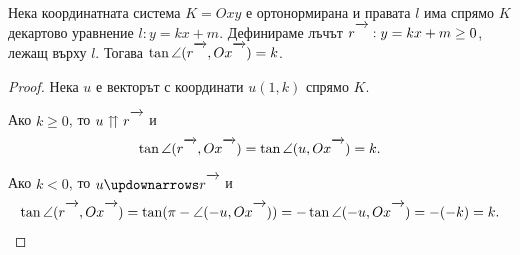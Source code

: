 \documentclass[numbers=endperiod, bibliography=totocnumbered]{scrartcl}
\begin{document}
\begin{proposition}
  Нека координатната система \( K = Oxy \) е ортонормирана и правата \( l \) има спрямо \( K \) декартово уравнение \( l: y = kx + m \). Дефинираме лъчът \( r\Ray : y = kx + m \geq 0 \), лежащ върху \( l \). Тогава \( \tan \angle(r\Ray, Ox\Ray) = k \).
\end{proposition}
\begin{proof}
  Нека \( u \) е векторът с координати \( u(1, k) \) спрямо \( K \).

  Ако \( k \geq 0 \), то \( u \upuparrows r\Ray \) и
  \begin{align*}
     \tan \angle(r\Ray, Ox\Ray) = \tan \angle(u, Ox\Ray) = k.
  \end{align*}

  Ако \( k < 0 \), то \( u \updownarrows r\Ray \) и
  \begin{align*}
    \tan \angle(r\Ray, Ox\Ray) = \tan(\pi - \angle(-u, Ox\Ray)) = -\tan \angle(-u, Ox\Ray) = -(-k) = k.
  \end{align*}
\end{proof}
\end{document}
